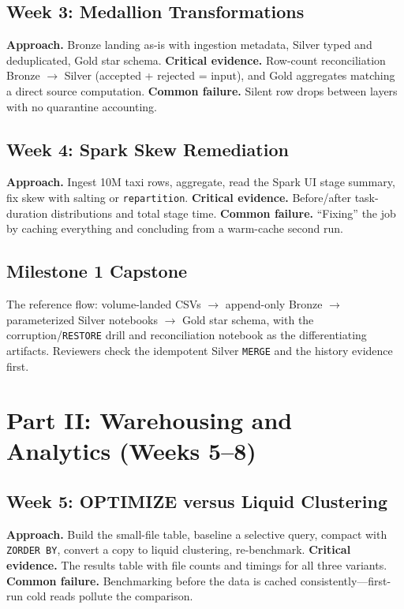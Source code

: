 \subsection{Week 3: Medallion Transformations}
\textbf{Approach.} Bronze landing as-is with ingestion metadata, Silver typed and deduplicated,
Gold star schema.
\textbf{Critical evidence.} Row-count reconciliation Bronze $\rightarrow$ Silver (accepted +
rejected = input), and Gold aggregates matching a direct source computation.
\textbf{Common failure.} Silent row drops between layers with no quarantine accounting.

\subsection{Week 4: Spark Skew Remediation}
\textbf{Approach.} Ingest 10M taxi rows, aggregate, read the Spark UI stage summary, fix skew with
salting or \texttt{repartition}.
\textbf{Critical evidence.} Before/after task-duration distributions and total stage time.
\textbf{Common failure.} ``Fixing'' the job by caching everything and concluding from a warm-cache
second run.

\subsection{Milestone 1 Capstone}
The reference flow: volume-landed CSVs $\rightarrow$ append-only Bronze $\rightarrow$ parameterized
Silver notebooks $\rightarrow$ Gold star schema, with the corruption/\texttt{RESTORE} drill and
reconciliation notebook as the differentiating artifacts. Reviewers check the idempotent Silver
\texttt{MERGE} and the history evidence first.

\section{Part II: Warehousing and Analytics (Weeks 5--8)}
\subsection{Week 5: OPTIMIZE versus Liquid Clustering}
\textbf{Approach.} Build the small-file table, baseline a selective query, compact with
\texttt{ZORDER BY}, convert a copy to liquid clustering, re-benchmark.
\textbf{Critical evidence.} The results table with file counts and timings for all three variants.
\textbf{Common failure.} Benchmarking before the data is cached consistently---first-run cold reads
pollute the comparison.


